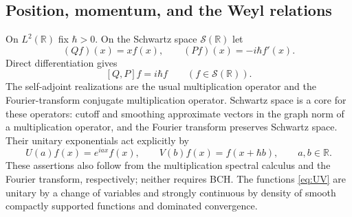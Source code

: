 \documentclass[11pt]{article}
\numberwithin{equation}{section}
\theoremstyle{definition}
\theoremstyle{remark}
\newcommand{\R}{\mathbb{R}}
\begin{document}
\subsection{Position, momentum, and the Weyl relations}
On $L^2(\R)$ fix $\hbar>0$. On the Schwartz space $\mathcal S(\R)$
let
\begin{equation}\label{eq:QP}
 (Qf)(x)=xf(x),\qquad (Pf)(x)=-i\hbar f'(x).
\end{equation}
Direct differentiation gives
\begin{equation}\label{eq:CCR}
 [Q,P]f=i\hbar f\qquad(f\in\mathcal S(\R)).
\end{equation}
The self-adjoint realizations are the usual multiplication operator
and the Fourier-transform conjugate multiplication operator.
Schwartz space is a core for these operators: cutoff and smoothing
approximate vectors in the graph norm of a multiplication operator,
and the Fourier transform preserves Schwartz space.
Their unitary exponentials act explicitly by
\begin{equation}\label{eq:UV}
 U(a)f(x)=e^{iax}f(x),\qquad
 V(b)f(x)=f(x+\hbar b),\qquad a,b\in\R.
\end{equation}
These assertions also follow from the multiplication spectral
calculus and the Fourier transform, respectively; neither requires
BCH. The functions \eqref{eq:UV} are unitary by a change of
variables and strongly continuous by density of smooth compactly
supported functions and dominated convergence.
\end{document}
